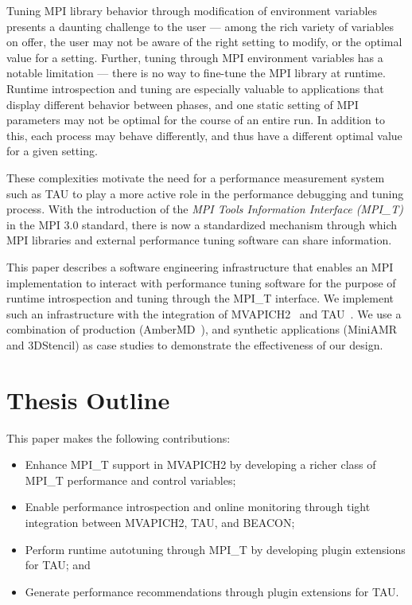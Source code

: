Tuning MPI library behavior through modification of environment variables presents a daunting challenge to the user --- among the rich variety of variables on offer, the user may not be aware of the right setting to modify, or the optimal value for a setting. Further, tuning through MPI environment variables has a notable limitation --- there is no way to fine-tune the MPI library at runtime. Runtime introspection and tuning are especially valuable to applications that display different behavior between phases, and one static setting of MPI parameters may not be optimal for the course of an entire run. In addition to this, each process may behave differently, and thus have a different optimal value for a given setting. \par
These complexities motivate the need for a performance measurement system such as TAU to play a more active role in the performance debugging and tuning process. With the introduction of the \textit{MPI Tools Information Interface (MPI\_T)} in the MPI 3.0 standard, there is now a standardized mechanism through which MPI libraries and external performance tuning software can share information. \par
This paper describes a software engineering infrastructure that enables an MPI implementation to interact with performance tuning software for the purpose of runtime introspection and tuning through the MPI\_T interface. We implement such an infrastructure with the integration of MVAPICH2~\cite{MVAPICH2} and TAU~\cite{Shende:2006:TPP:1125980.1125982}. We use a combination of production (AmberMD~\cite{AmberMD}), and synthetic applications (MiniAMR~\cite{Mantevo} and 3DStencil) as case studies to demonstrate the effectiveness of our design.

\section {Thesis Outline}

This paper makes the following contributions:
\begin{itemize}
	\item Enhance MPI\_T support in MVAPICH2 by developing a richer class of MPI\_T performance and control variables;
	\item Enable performance introspection and online monitoring through tight integration between MVAPICH2, TAU, and BEACON;
	\item Perform runtime autotuning through MPI\_T by developing plugin extensions for TAU; and 
	\item Generate performance recommendations through plugin extensions for TAU.
\end{itemize}
